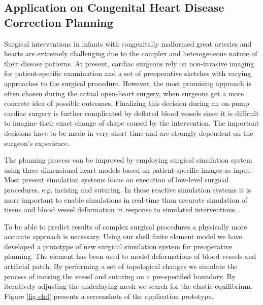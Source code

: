 \documentclass{egpubl}
\begin{document}
\subsection{Application on Congenital Heart Disease Correction Planning}

Surgical interventions in infants with congenitally malformed great arteries
and hearts are extremely challenging due to the complex and heterogeneous
nature of their disease patterns. At present, cardiac surgeons rely on
non-invasive imaging for patient-specific examination and a set of preoperative
sketches with varying approaches to the surgical procedure. However, the most
promising approach is often chosen during the actual open-heart surgery, when
surgeons get a more concrete idea of possible outcomes. Finalizing this
decision during an on-pump cardiac surgery is further complicated by deflated
blood vessels since it is difficult to imagine their exact change of shape
caused by the intervention. The important decisions have to be made in very
short time and are strongly dependent on the surgeon's experience.

The planning process can be improved by employing surgical simulation system
using three-dimensional heart models based on patient-specific images as input.
Most present simulation systems focus on execution of low-level surgical
procedures, e.g. incising and suturing. In these reactive simulation systems it
is more important to enable simulations in real-time than accurate simulation
of tissue and blood vessel deformation in response to simulated interventions.

To be able to predict results of complex surgical procedures a physically more
accurate approach is necessary. Using our shell finite element model we have
developed a prototype \cite{Kislinskiy2012} of new surgical simulation system
for preoperative planning. The element has been used to model deformations of
blood vessels and artificial patch. By performing a set of topological changes
we simulate the process of incising the vessel and suturing on a pre-specified
boundary. By iteratively adjusting the underlaying mesh we search for the
elastic equilibrium. Figure \ref{fig-chd} presents a screenshots of the
application prototype.


%
%
\end{document}
